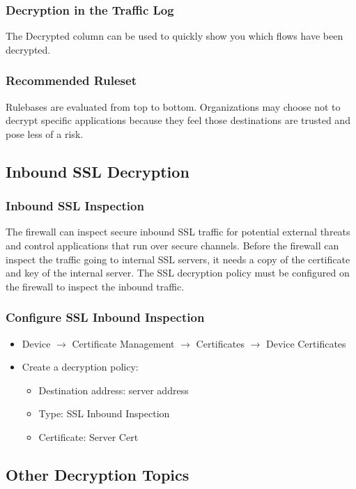 \subsubsection{Decryption in the Traffic Log}
The Decrypted column can be used to quickly show you which flows have been decrypted.


\subsubsection{Recommended Ruleset}
Rulebases are evaluated from top to bottom.
Organizations may choose not to decrypt specific applications because they feel those destinations are trusted and pose less of a risk.


\subsection{Inbound SSL Decryption}
\subsubsection{Inbound SSL Inspection}
The firewall can inspect secure inbound SSL traffic for potential external threats and control applications that run over secure channels.
Before the firewall can inspect the traffic going to internal SSL servers, it needs a copy of the certificate and key of the internal server.
The SSL decryption policy must be configured on the firewall to inspect the inbound traffic.

\subsubsection{Configure SSL Inbound Inspection}
\begin{itemize}
    \item Device $\rightarrow$ Certificate Management $\rightarrow$ Certificates $\rightarrow$ Device Certificates
    \item Create a decryption policy:
        \begin{itemize}
            \item Destination address: server address
            \item Type: SSL Inbound Inspection
            \item Certificate: Server Cert
        \end{itemize}
\end{itemize}

\subsection{Other Decryption Topics}
